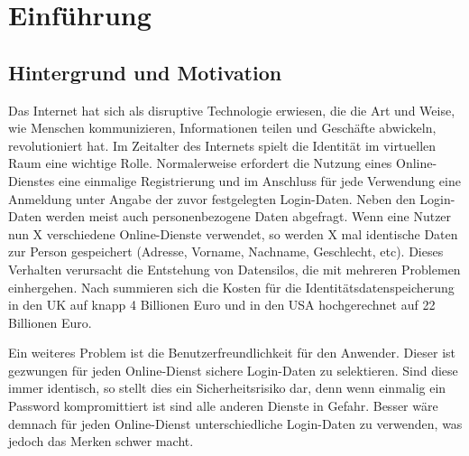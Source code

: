 \chapter{Einführung}
\label{cha:einfuehrung}

\section{Hintergrund und Motivation}

\begin{comment}
	Internet als disruptive Technologie
	Identität im Internet
	Entstehung von Datensilos die allesamt ähnliche Identitätsdaten speichern
	Große ineffizienz - kosten im 2stelliegn billionen bereich
	Schlechte usibility für user, da entweder immer selbe credentials, was unsicher ist, oder immer verschiedene, wobei man einen passwortmanager braucht
	Ebenso angriffsverktor für Angreifer
	Nach Abgaben leiden 82\% der Online-Businesse mit Fake-Usern
	Ebenso 18\% der Einkaufswagen werden aufgrund Credential-Problem verwahrlost
	
\end{comment}
 
Das Internet hat sich als disruptive Technologie erwiesen, die die Art und Weise, wie Menschen kommunizieren, Informationen teilen und Geschäfte abwickeln, revolutioniert hat. Im Zeitalter des Internets spielt die Identität im virtuellen Raum eine wichtige Rolle. Normalerweise erfordert die Nutzung eines Online-Dienstes eine einmalige Registrierung und im Anschluss für jede Verwendung eine Anmeldung unter Angabe der zuvor festgelegten Login-Daten. Neben den Login-Daten werden meist auch personenbezogene Daten abgefragt. Wenn eine Nutzer nun X verschiedene Online-Dienste verwendet, so werden X mal identische Daten zur Person gespeichert (Adresse, Vorname, Nachname, Geschlecht, etc). Dieses Verhalten verursacht die Entstehung von Datensilos, die mit mehreren Problemen einhergehen. Nach \cite{ID10} summieren sich die Kosten für die Identitätsdatenspeicherung in den UK auf knapp 4 Billionen Euro und in den USA hochgerechnet auf 22 Billionen Euro. 

Ein weiteres Problem ist die Benutzerfreundlichkeit für den Anwender. Dieser ist gezwungen für jeden Online-Dienst sichere Login-Daten zu selektieren. Sind diese immer identisch, so stellt dies ein Sicherheitsrisiko dar, denn wenn einmalig ein Password kompromittiert ist sind alle anderen Dienste in Gefahr. Besser wäre demnach für jeden Online-Dienst unterschiedliche Login-Daten zu verwenden, was jedoch das Merken schwer macht.

